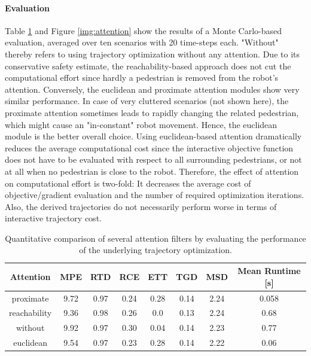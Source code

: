 \paragraph{Evaluation}
Table \ref{table:attention} and Figure \ref{img:attention} show the results of a Monte Carlo-based evaluation, averaged over ten scenarios with 20 time-steps each. "Without" thereby refers to using trajectory optimization without any attention. Due to its conservative safety estimate, the reachability-based approach does not cut the computational effort since hardly a pedestrian is removed from the robot's attention. Conversely, the euclidean and proximate attention modules show very similar performance. In case of very cluttered scenarios (not shown here), the proximate attention sometimes leads to rapidly changing the related pedestrian, which might cause an "in-constant" robot movement. Hence, the euclidean module is the better overall choice.
\newline
Using euclidean-based attention dramatically reduces the average computational cost since the interactive objective function does not have to be evaluated with respect to all surrounding pedestrians, or not at all when no pedestrian is close to the robot. Therefore, the effect of attention on computational effort is two-fold: It decreases the average cost of objective/gradient evaluation and the number of required optimization iterations. Also, the derived trajectories do not necessarily perform worse in terms of interactive trajectory cost. 

\begin{table}[!ht]
\begin{center}
\begin{tabular}{c|c|c|c|c|c|c|c}
\bf Attention & \bf MPE & \bf RTD & \bf RCE & \bf ETT & \bf TGD & \bf MSD & \bf Mean Runtime [s] \\
\hline
proximate & 9.72 & 0.97 & 0.24 & 0.28 & 0.14 & 2.24 & 0.058 \\
\hline
reachability & 9.36 & 0.98 & 0.26 & 0.0 & 0.13 & 2.24 & 0.68 \\
\hline
\rowcolor{baseline_color}
without & 9.92 & 0.97 & 0.30 & 0.04 & 0.14 & 2.23 & 0.77 \\ 
\hline
\rowcolor{our_color}
euclidean & 9.54 & 0.97 & 0.23 & 0.28 & 0.14 & 2.22 & 0.06
\end{tabular}
\end{center}
\caption{Quantitative comparison of several attention filters by evaluating the performance of the underlying trajectory optimization.}
\label{table:attention}
\end{table}

